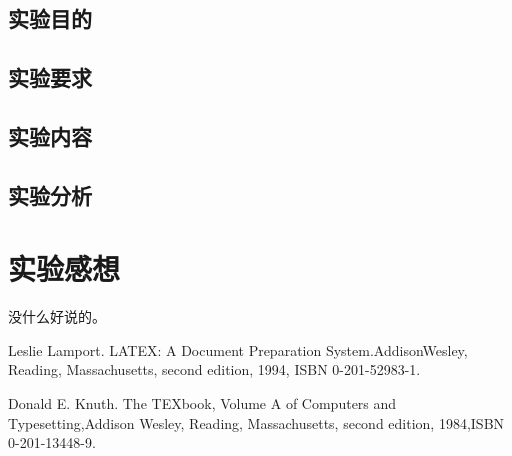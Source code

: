 \documentclass[a4paper,12pt]{report}
\begin{document}
\begin{spacing}{1.5}
\section{实验目的}

\section{实验要求}

\section{实验内容}

\section{实验分析}

\end{spacing}

\chapter{实验感想}
\begin{spacing}{1.5}
	没什么好说的。
\end{spacing}


\begin{thebibliography}{99}
\songti {} 	
	Leslie Lamport. LATEX: A Document Preparation System.AddisonWesley, Reading, Massachusetts, second edition, 1994, ISBN 0-201-52983-1.
	
	Donald E. Knuth. The TEXbook, Volume A of Computers and Typesetting,Addison Wesley, Reading, Massachusetts, second edition, 1984,ISBN 0-201-13448-9.

	
\end{thebibliography}
\end{document}
